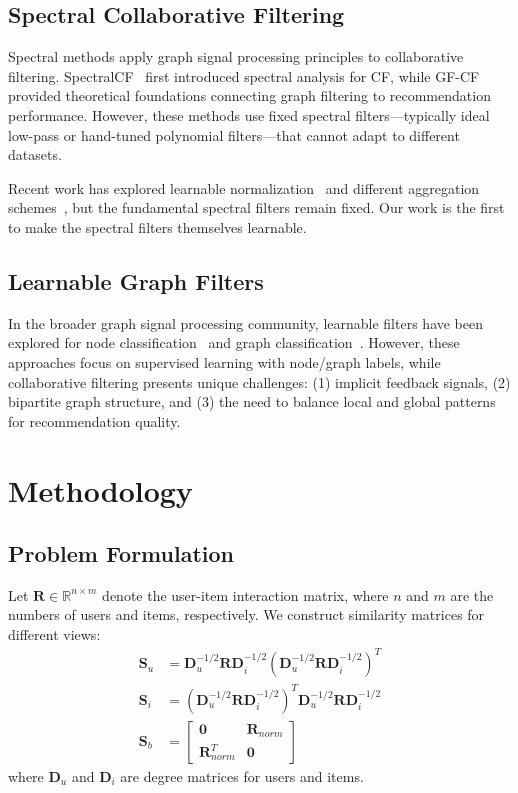\documentclass[10pt,twocolumn,letterpaper]{article}
\begin{document}
\subsection{Spectral Collaborative Filtering}
Spectral methods apply graph signal processing principles to collaborative filtering. SpectralCF~\cite{zheng2020spectral} first introduced spectral analysis for CF, while GF-CF~\cite{liu2021gfcf} provided theoretical foundations connecting graph filtering to recommendation performance. However, these methods use fixed spectral filters—typically ideal low-pass or hand-tuned polynomial filters—that cannot adapt to different datasets.

Recent work has explored learnable normalization~\cite{wang2022polycf} and different aggregation schemes~\cite{sun2023ultra}, but the fundamental spectral filters remain fixed. Our work is the first to make the spectral filters themselves learnable.

\subsection{Learnable Graph Filters}
In the broader graph signal processing community, learnable filters have been explored for node classification~\cite{kipf2016semi} and graph classification~\cite{xu2018powerful}. However, these approaches focus on supervised learning with node/graph labels, while collaborative filtering presents unique challenges: (1) implicit feedback signals, (2) bipartite graph structure, and (3) the need to balance local and global patterns for recommendation quality.

\section{Methodology}

\subsection{Problem Formulation}

Let $\mathbf{R} \in \mathbb{R}^{n \times m}$ denote the user-item interaction matrix, where $n$ and $m$ are the numbers of users and items, respectively. We construct similarity matrices for different views:
\begin{align}
\mathbf{S}_u &= \mathbf{D}_u^{-1/2} \mathbf{R} \mathbf{D}_i^{-1/2} (\mathbf{D}_u^{-1/2} \mathbf{R} \mathbf{D}_i^{-1/2})^T \\
\mathbf{S}_i &= (\mathbf{D}_u^{-1/2} \mathbf{R} \mathbf{D}_i^{-1/2})^T \mathbf{D}_u^{-1/2} \mathbf{R} \mathbf{D}_i^{-1/2} \\
\mathbf{S}_b &= \begin{bmatrix} \mathbf{0} & \mathbf{R}_{norm} \\ \mathbf{R}_{norm}^T & \mathbf{0} \end{bmatrix}
\end{align}
where $\mathbf{D}_u$ and $\mathbf{D}_i$ are degree matrices for users and items.
\end{document}
